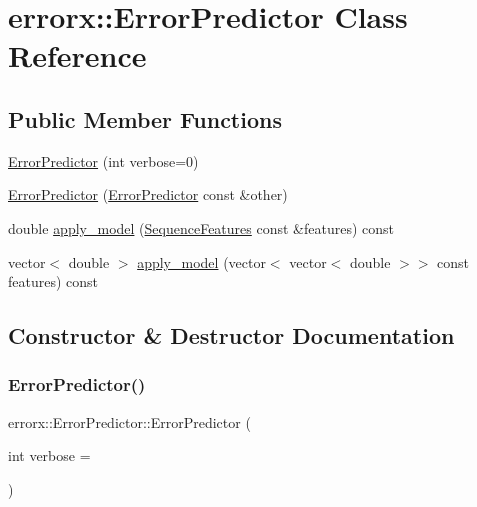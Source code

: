 \hypertarget{classerrorx_1_1_error_predictor}{}\section{errorx\+:\+:Error\+Predictor Class Reference}
\label{classerrorx_1_1_error_predictor}
\subsection*{Public Member Functions}
\begin{DoxyCompactItemize}
\item 
\mbox{\hyperlink{classerrorx_1_1_error_predictor_ad00dcb127a4f2e98bbe940271cce277f}{Error\+Predictor}} (int verbose=0)
\item 
\mbox{\hyperlink{classerrorx_1_1_error_predictor_a4604f7bd37aadcad0851d4a2ccfb47f0}{Error\+Predictor}} (\mbox{\hyperlink{classerrorx_1_1_error_predictor}{Error\+Predictor}} const \&other)
\item 
double \mbox{\hyperlink{classerrorx_1_1_error_predictor_a14bf5197cc1ce818fdc5ef44579ad1ef}{apply\+\_\+model}} (\mbox{\hyperlink{classerrorx_1_1_sequence_features}{Sequence\+Features}} const \&features) const
\item 
vector$<$ double $>$ \mbox{\hyperlink{classerrorx_1_1_error_predictor_a9a6b40a5b46466df1a16f904b4b629bb}{apply\+\_\+model}} (vector$<$ vector$<$ double $>$$>$ const features) const
\end{DoxyCompactItemize}


\subsection{Constructor \& Destructor Documentation}
\mbox{\label{classerrorx_1_1_error_predictor_ad00dcb127a4f2e98bbe940271cce277f}} 
\subsubsection{\texorpdfstring{Error\+Predictor()}{ErrorPredictor()}\hspace{0.1cm}{\footnotesize\ttfamily [1/2]}}
{\footnotesize\ttfamily errorx\+::\+Error\+Predictor\+::\+Error\+Predictor (\begin{DoxyParamCaption}\item[{int}]{verbose = {} }\end{DoxyParamCaption})}

